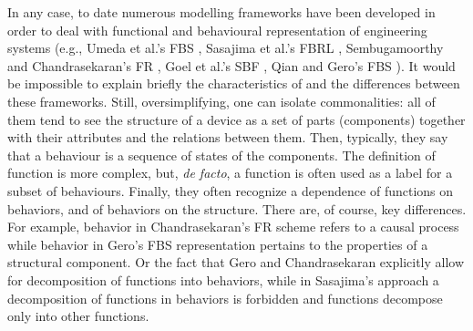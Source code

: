 \documentclass[sw]{iosart2x}
\newcommand{\myComment}[1]{{\unskip \ignorespaces}}
\begin{document}
In any case, to date numerous modelling frameworks have been developed in order to deal with functional and behavioural representation of engineering systems (e.g., Umeda et al.'s FBS \cite{umedaFunctionBehaviourStructure1990}, Sasajima et al.'s FBRL \cite{sasajimaFBRLFunctionBehavior1995}, Sembugamoorthy and Chandrasekaran's FR \cite{sembugamoorthy1986functional}, Goel et al.'s SBF \cite{goelUseDesignPatterns2004}, Qian and Gero's FBS \cite{qianFunctionBehaviorStructure1996}).
It would be impossible to explain briefly the characteristics of and the differences between these frameworks. Still, oversimplifying, one can isolate commonalities: all of them tend to see the structure of a device as a set of parts (components) together with their attributes and the relations between them. Then, typically, they say that a behaviour is a sequence of states of the components. The definition of function is more \myComment{murky} complex, but, \textit{de facto}, a function is often used as a label for a subset of behaviours. Finally, they often recognize a dependence of functions on behaviors, and of behaviors on the structure. 
There are, of course, key differences. 
For example, behavior in Chandrasekaran’s FR scheme refers to a causal process while behavior in Gero’s FBS representation pertains to the properties of a structural component.
Or the fact that Gero and Chandrasekaran explicitly allow for decomposition of functions into behaviors, while in Sasajima's approach a decomposition of functions in behaviors is forbidden and functions decompose only into other functions.  
\end{document}
